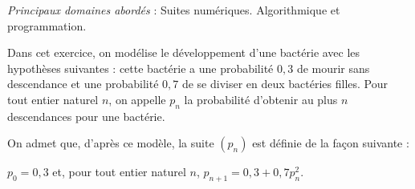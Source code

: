 
\medskip

\emph{Principaux domaines abordés} : Suites numériques.
Algorithmique et programmation.

\bigskip

%
Dans cet exercice, on modélise le développement d'une bactérie avec les hypothèses suivantes : cette bactérie a une probabilité $0,3$ de mourir sans descendance et une probabilité $0,7$ de se diviser en deux bactéries filles.
%
%
Pour tout entier naturel $n$, on appelle $p_n$ la probabilité d'obtenir au plus $n$ descendances pour une bactérie. 

On admet que, d'après ce modèle, la suite $\left(p_n\right)$ est définie de la façon suivante :

$p_0 = 0,3$ et, pour tout entier naturel $n$, $p_{n+1} = 0,3 + 0,7p_n^2$.

